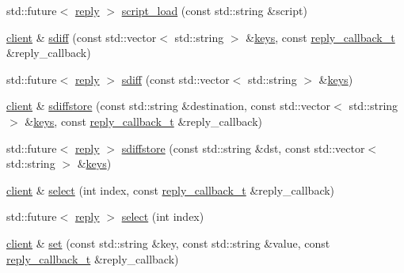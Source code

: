 \begin{DoxyCompactItemize}
\item 
std\+::future$<$ \hyperlink{classcpp__redis_1_1reply}{reply} $>$ \hyperlink{classcpp__redis_1_1client_a2c42d83c0bfcb46d41d2c205d808e6c8}{script\+\_\+load} (const std\+::string \&script)
\item 
\hyperlink{classcpp__redis_1_1client}{client} \& \hyperlink{classcpp__redis_1_1client_a9d70980e8fc5c90f218c5fd2215bed89}{sdiff} (const std\+::vector$<$ std\+::string $>$ \&\hyperlink{classcpp__redis_1_1client_acb7845a206b2321e6919c2f38282c322}{keys}, const \hyperlink{classcpp__redis_1_1client_a061a1140d36d2eaeda82b09a0bb3f9f2}{reply\+\_\+callback\+\_\+t} \&reply\+\_\+callback)
\item 
std\+::future$<$ \hyperlink{classcpp__redis_1_1reply}{reply} $>$ \hyperlink{classcpp__redis_1_1client_a93ff7c295d6147d3d452364533a19de9}{sdiff} (const std\+::vector$<$ std\+::string $>$ \&\hyperlink{classcpp__redis_1_1client_acb7845a206b2321e6919c2f38282c322}{keys})
\item 
\hyperlink{classcpp__redis_1_1client}{client} \& \hyperlink{classcpp__redis_1_1client_a0f896b36f3284d66bb1679f535378bf5}{sdiffstore} (const std\+::string \&destination, const std\+::vector$<$ std\+::string $>$ \&\hyperlink{classcpp__redis_1_1client_acb7845a206b2321e6919c2f38282c322}{keys}, const \hyperlink{classcpp__redis_1_1client_a061a1140d36d2eaeda82b09a0bb3f9f2}{reply\+\_\+callback\+\_\+t} \&reply\+\_\+callback)
\item 
std\+::future$<$ \hyperlink{classcpp__redis_1_1reply}{reply} $>$ \hyperlink{classcpp__redis_1_1client_afd4930fd767bbf14bae1f5ddfd8ee212}{sdiffstore} (const std\+::string \&dst, const std\+::vector$<$ std\+::string $>$ \&\hyperlink{classcpp__redis_1_1client_acb7845a206b2321e6919c2f38282c322}{keys})
\item 
\hyperlink{classcpp__redis_1_1client}{client} \& \hyperlink{classcpp__redis_1_1client_aee37b9bd265b8db614b4d7dcfdbaa422}{select} (int index, const \hyperlink{classcpp__redis_1_1client_a061a1140d36d2eaeda82b09a0bb3f9f2}{reply\+\_\+callback\+\_\+t} \&reply\+\_\+callback)
\item 
std\+::future$<$ \hyperlink{classcpp__redis_1_1reply}{reply} $>$ \hyperlink{classcpp__redis_1_1client_a5eae97b05129d0571c3b871e1a786434}{select} (int index)
\item 
\hyperlink{classcpp__redis_1_1client}{client} \& \hyperlink{classcpp__redis_1_1client_a6d654139ca804e9ee2ac0d0683878ece}{set} (const std\+::string \&key, const std\+::string \&value, const \hyperlink{classcpp__redis_1_1client_a061a1140d36d2eaeda82b09a0bb3f9f2}{reply\+\_\+callback\+\_\+t} \&reply\+\_\+callback)

\end{DoxyCompactItemize}

